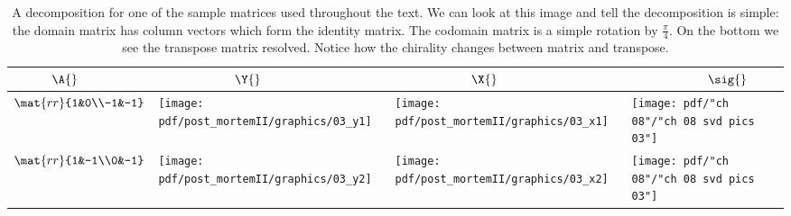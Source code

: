 \break
\clearpage
\begin{landscape}
\thispagestyle{empty}
\begin{table}[htdp]
\begin{center}
\begin{tabular}{m{0.75in}m{1.75in}m{1.75in}m{1.75in}}
  $ \quad \qquad \A{}$ & $\qquad \qquad \qquad \Y{}$ & $\qquad \qquad \qquad \X{}$ & $\qquad \qquad \qquad \sig{}$ \\ \hline\hline
  $\mat{rr}{1&0\\-1&-1}$ \qquad & \qquad 
  \texttt{[image: pdf/post\_mortemII/graphics/03\_y1]} \qquad & \qquad 
  \texttt{[image: pdf/post\_mortemII/graphics/03\_x1]} \qquad & \qquad 
  \texttt{[image: pdf/"ch 08"/"ch 08 svd pics 03"]} \\
  $\mat{rr}{1&-1\\0&-1}$ \qquad & \qquad 
  \texttt{[image: pdf/post\_mortemII/graphics/03\_y2]} \qquad & \qquad 
  \texttt{[image: pdf/post\_mortemII/graphics/03\_x2]} \qquad & \qquad 
  \texttt{[image: pdf/"ch 08"/"ch 08 svd pics 03"]} \\
\end{tabular}
\end{center}
\caption[A decomposition for one of the sample matrices]{A decomposition for one of the sample matrices used throughout the text. We can look at this image and tell the decomposition is simple: the domain matrix has column vectors which form the identity matrix. The codomain matrix is a simple rotation by $\frac{\pi}{4}$. On the bottom we see the transpose matrix resolved. Notice how the chirality changes between matrix and transpose.}
\label{tab:pmII:visualsc}
\end{table}%
\end{landscape}



